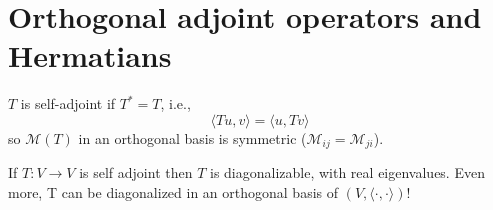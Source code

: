 \documentclass{report}
\begin{document}

\section{Orthogonal adjoint operators and Hermatians}





\begin{definition}
  \( T \) is self-adjoint if \( T^* = T \), i.e., 
  \begin{displaymath}
    \langle T u , v \rangle = \langle u,Tv \rangle 
  \end{displaymath}
  so \( \mathcal{M}(T) \) in an orthogonal basis is symmetric (\( \mathcal{M}_{ij}=\mathcal{M}_{ji} \)). 
\end{definition}



\begin{theorem}  
  If \( T : V \to  V  \) is self adjoint then \( T \) is diagonalizable, with real eigenvalues. Even more, T can be diagonalized in an orthogonal basis of \( ( V, \langle \cdot , \cdot  \rangle ) \)!  

\end{theorem}
\end{document}
